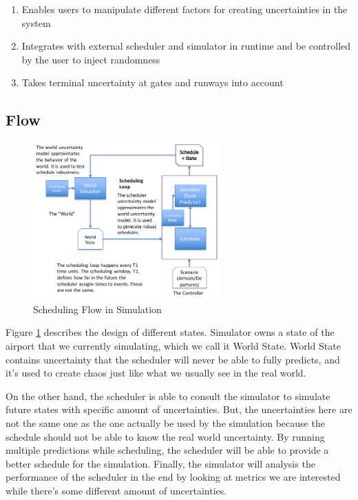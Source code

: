\documentclass[conference]{IEEEtran}
\begin{document}
\begin{enumerate}
    \item Enables users to manipulate different factors for creating uncertainties in the system
    \item Integrates with external scheduler and simulator in runtime and be controlled by the user to inject randomness
    \item Takes terminal uncertainty at gates and runways into account
\end{enumerate}

\subsection{Flow}

\begin{figure}
\centering
\includegraphics[width=2.8in]{flow}
\caption{Scheduling Flow in Simulation\label{flow}}
\end{figure}

Figure \ref{flow} describes the design of different states. Simulator owns a state of the airport that we currently simulating, which we call it World State. World State contains uncertainty that the scheduler will never be able to fully predicts, and it's used to create chaos just like what we usually see in the real world.

On the other hand, the scheduler is able to consult the simulator to simulate future states with specific amount of uncertainties. But, the uncertainties here are not the same one as the one actually be used by the simulation because the schedule should not be able to know the real world uncertainty. By running multiple predictions while scheduling, the scheduler will be able to provide a better schedule for the simulation. Finally, the simulator will analysis the performance of the scheduler in the end by looking at metrics we are interested while there's some different amount of uncertainties.
\end{document}
